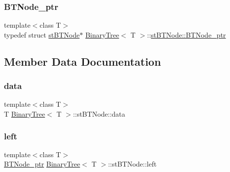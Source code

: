 \subsubsection{\texorpdfstring{B\+T\+Node\+\_\+ptr}{BTNode\_ptr}}
{\footnotesize\ttfamily template$<$class T$>$ \\
typedef struct \hyperlink{struct_binary_tree_1_1st_b_t_node}{st\+B\+T\+Node}$\ast$ \hyperlink{class_binary_tree}{Binary\+Tree}$<$ T $>$\+::\hyperlink{struct_binary_tree_1_1st_b_t_node_a33f8df7b779a039664f5b5abc92c134f}{st\+B\+T\+Node\+::\+B\+T\+Node\+\_\+ptr}}



\subsection{Member Data Documentation}
\mbox{\label{struct_binary_tree_1_1st_b_t_node_ab20fac952b000efe0adaeb60277cf572}} 
\subsubsection{\texorpdfstring{data}{data}}
{\footnotesize\ttfamily template$<$class T$>$ \\
T \hyperlink{class_binary_tree}{Binary\+Tree}$<$ T $>$\+::st\+B\+T\+Node\+::data}

\mbox{\label{struct_binary_tree_1_1st_b_t_node_af6721dfa7f77e2747996469aea4581d7}} 
\subsubsection{\texorpdfstring{left}{left}}
{\footnotesize\ttfamily template$<$class T$>$ \\
\hyperlink{struct_binary_tree_1_1st_b_t_node_a33f8df7b779a039664f5b5abc92c134f}{B\+T\+Node\+\_\+ptr} \hyperlink{class_binary_tree}{Binary\+Tree}$<$ T $>$\+::st\+B\+T\+Node\+::left}

\mbox{\label{struct_binary_tree_1_1st_b_t_node_a9df117a2125417974d206c8afa9b67b7}} 
